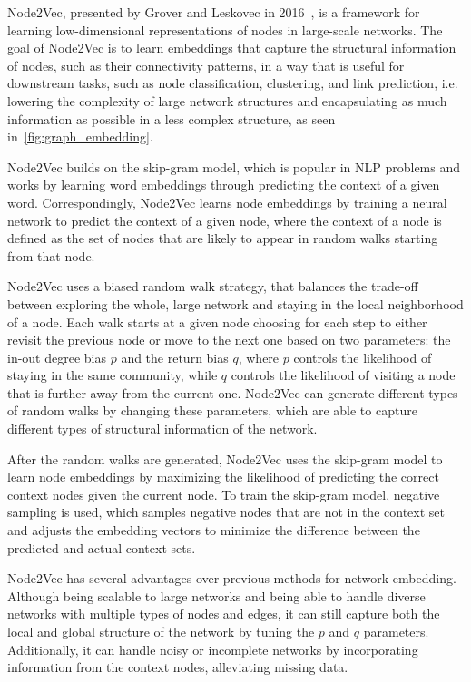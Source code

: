 Node2Vec, presented by Grover and Leskovec in 2016~\cite{2016node2vec}, is a framework for learning low-dimensional representations of nodes in large-scale networks. The goal of Node2Vec is to learn embeddings that capture the structural information of nodes, such as their connectivity patterns, in a way that is useful for downstream tasks, such as node classification, clustering, and link prediction, i.e. lowering the complexity of large network structures and encapsulating as much information as possible in a less complex structure, as seen in~\autoref{fig:graph_embedding}.

Node2Vec builds on the skip-gram model, which is popular in NLP problems and works by learning word embeddings through predicting the context of a given word. Correspondingly, Node2Vec learns node embeddings by training a neural network to predict the context of a given node, where the context of a node is defined as the set of nodes that are likely to appear in random walks starting from that node.

Node2Vec uses a biased random walk strategy, that balances the trade-off between exploring the whole, large network and staying in the local neighborhood of a node. Each walk starts at a given node choosing for each step to either revisit the previous node or move to the next one based on two parameters: the in-out degree bias  $p$ and the return bias $q$, where $p$ controls the likelihood of staying in the same community, while $q$ controls the likelihood of visiting a node that is further away from the current one. Node2Vec can generate different types of random walks by changing these parameters, which are able to capture different types of structural information of the network.

After the random walks are generated, Node2Vec uses the skip-gram model to learn node embeddings by maximizing the likelihood of predicting the correct context nodes given the current node. To train the skip-gram model, negative sampling is used, which samples negative nodes that are not in the context set and adjusts the embedding vectors to minimize the difference between the predicted and actual context sets.

Node2Vec has several advantages over previous methods for network embedding. Although being scalable to large networks and being able to handle diverse networks with multiple types of nodes and edges, it can still capture both the local and global structure of the network by tuning the $p$ and $q$ parameters. Additionally, it can handle noisy or incomplete networks by incorporating information from the context nodes, alleviating missing data. 

